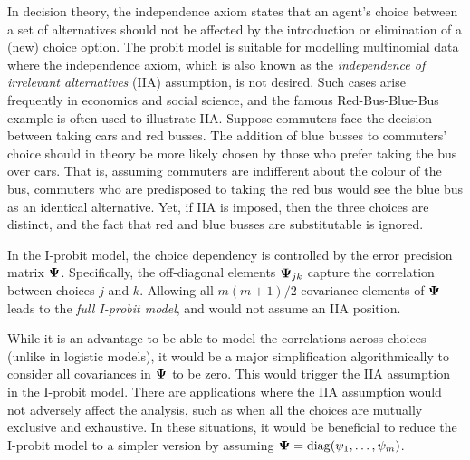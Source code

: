 In decision theory, the independence axiom states that an agent's choice between a set of alternatives should not be affected by the introduction or elimination of a (new) choice option.
The probit model is suitable for modelling multinomial data where the independence axiom, which is also known as the \emph{independence of irrelevant alternatives} (IIA) assumption, is not desired. 
Such cases arise frequently in economics and social science, and the famous Red-Bus-Blue-Bus example is often used to illustrate IIA.
Suppose commuters face the decision between taking cars and red busses. 
The addition of blue busses to commuters' choice should in theory be more likely chosen by those who prefer taking the bus over cars.
That is, assuming commuters are indifferent about the colour of the bus, commuters who are predisposed to taking the red bus would see the blue bus as an identical alternative.
 Yet, if IIA is imposed, then the three choices are distinct, and the fact that red and blue busses are substitutable is ignored.

In the I-probit model, the choice dependency is controlled by the error precision matrix ${\bm\Psi}$.
Specifically, the off-diagonal elements ${\bm\Psi}_{jk}$ capture the correlation between choices $j$ and $k$.
Allowing all $m(m+1)/2$ covariance elements of ${\bm\Psi}$ leads to the \emph{full I-probit model}, and would not assume an IIA position.


While it is an advantage to be able to model the correlations across choices (unlike in logistic models), it would be a major simplification algorithmically to consider all covariances in ${\bm\Psi}$ to be zero.
This would trigger the IIA assumption in the I-probit model.
There are applications where the IIA assumption would not adversely affect the analysis, such as when all the choices are mutually exclusive and exhaustive.
In these situations, it would be beneficial to reduce the I-probit model to a simpler version by assuming ${\bm\Psi} = \operatorname{diag}(\psi_1,\dots,\psi_m)$.

